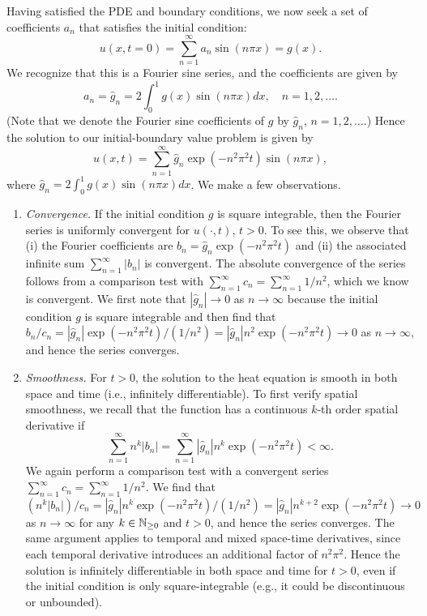 Having satisfied the PDE and boundary conditions, we now seek a set of coefficients $a_n$ that satisfies the initial condition:
\[u(x, t = 0) = \sum_{n=1}^{\infty} a_n \sin(n\pi x) = g(x).\]
We recognize that this is a Fourier sine series, and the coefficients are given by
\[a_n = \hat{g}_n = 2 \int_0^1 g(x) \sin(n\pi x) dx, \quad n = 1, 2, \dots.\]
(Note that we denote the Fourier sine coefficients of $g$ by $\hat{g}_n$, $n = 1, 2, \dots$.) Hence the solution to our initial-boundary value problem is given by
\begin{equation*}
    u(x, t) = \sum_{n=1}^{\infty} \hat{g}_n \exp(-n^2\pi^2 t) \sin(n\pi x), \tag{6.2}
\end{equation*}
where $\hat{g}_n = 2 \int_0^1 g(x) \sin(n\pi x) dx$. We make a few observations.
\begin{enumerate}
    \item \textit{Convergence.} If the initial condition $g$ is square integrable, then the Fourier series is uniformly convergent for $u(\cdot, t)$, $t > 0$. To see this, we observe that (i) the Fourier coefficients are $b_n = \hat{g}_n \exp(-n^2\pi^2 t)$ and (ii) the associated infinite sum $\sum_{n=1}^{\infty} |b_n|$ is convergent. The absolute convergence of the series follows from a comparison test with $\sum_{n=1}^{\infty} c_n = \sum_{n=1}^{\infty} 1/n^2$, which we know is convergent. We first note that $|\hat{g}_n| \to 0$ as $n \to \infty$ because the initial condition $g$ is square integrable and then find that $b_n / c_n = |\hat{g}_n| \exp(-n^2\pi^2 t)/(1/n^2) = |\hat{g}_n| n^2 \exp(-n^2\pi^2 t) \to 0$ as $n \to \infty$, and hence the series converges.
    \item \textit{Smoothness.} For $t > 0$, the solution to the heat equation is smooth in both space and time (i.e., infinitely differentiable). To first verify spatial smoothness, we recall that the function has a continuous $k$-th order spatial derivative if
    \[\sum_{n=1}^{\infty} n^k |b_n| = \sum_{n=1}^{\infty} |\hat{g}_n| n^k \exp(-n^2\pi^2 t) < \infty.\]
    We again perform a comparison test with a convergent series $\sum_{n=1}^{\infty} c_n = \sum_{n=1}^{\infty} 1/n^2$. We find that $(n^k |b_n|)/c_n = |\hat{g}_n| n^k \exp(-n^2\pi^2 t)/(1/n^2) = |\hat{g}_n| n^{k+2} \exp(-n^2\pi^2 t) \to 0$ as $n \to \infty$ for any $k \in \mathbb{N}_{\geq 0}$ and $t > 0$, and hence the series converges. The same argument applies to temporal and mixed space-time derivatives, since each temporal derivative introduces an additional factor of $n^2\pi^2$. Hence the solution is infinitely differentiable in both space and time for $t > 0$, even if the initial condition is only square-integrable (e.g., it could be discontinuous or unbounded).

\end{enumerate}
